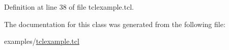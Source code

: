 Definition at line 38 of file tclexample.\+tcl.


\begin{DoxyCode}{0}

\end{DoxyCode}


The documentation for this class was generated from the following file\+:\begin{DoxyCompactItemize}
\item 
examples/\mbox{\hyperlink{tclexample_8tcl}{tclexample.\+tcl}}\end{DoxyCompactItemize}
